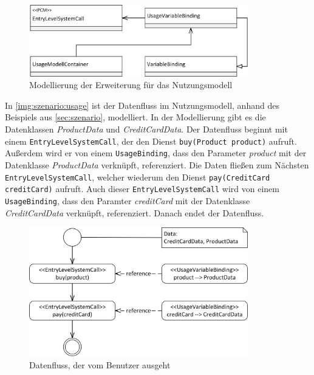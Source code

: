 \begin{figure}[h]
	\centering
  	\includegraphics[width=0.85\textwidth]{images/meta_usage.png}
	\caption{Modellierung der Erweiterung für das Nutzungsmodell}
	\label{img:modell:usage}
\end{figure}
In \autoref{img:szenario:usage} ist der Datenfluss im Nutzungsmodell, anhand des Beispiels aus \autoref{sec:szenario}, modelliert. In der Modellierung gibt es die Datenklassen \textit{ProductData} und \textit{CreditCardData}. Der Datenfluss beginnt mit einem \texttt{EntryLevelSystemCall}, der den Dienst \texttt{buy(Product product)} aufruft. Außerdem wird er von einem \texttt{UsageBinding}, dass den Parameter \textit{product} mit der Datenklasse \textit{ProductData} verknüpft, referenziert. Die Daten fließen zum Nächsten \texttt{EntryLevelSystemCall}, welcher wiederum den Dienst \texttt{pay(CreditCard creditCard)} aufruft. Auch dieser \texttt{EntryLevelSystemCall} wird von einem \texttt{UsageBinding}, dass den Paramter \textit{creditCard} mit der Datenklasse \textit{CreditCardData} verknüpft, referenziert. Danach endet der Datenfluss.

\begin{figure}[h]
	\centering
  	\includegraphics[width=0.85\textwidth]{images/szenario_usage.png}
	\caption{Datenfluss, der vom Benutzer ausgeht}
	\label{img:szenario:usage}
\end{figure}